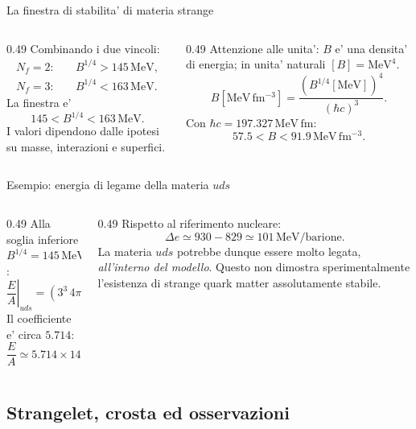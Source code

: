 \begin{frame}{La finestra di stabilita' di materia strange}
\small
\begin{columns}[T,onlytextwidth]
\begin{column}{0.49\textwidth}
Combinando i due vincoli:
\[
\begin{aligned}
N_f=2:&\quad B^{1/4}>145\,\mathrm{MeV},\\
N_f=3:&\quad B^{1/4}<163\,\mathrm{MeV}.
\end{aligned}
\]
La finestra e'
\[
145<B^{1/4}<163\,\mathrm{MeV}.
\]
I valori dipendono dalle ipotesi
su masse, interazioni e superfici.
\end{column}
\begin{column}{0.49\textwidth}
Attenzione alle unita': $B$ e' una
densita' di energia; in unita' naturali
$[B]=\mathrm{MeV}^4$.
\[
B[\mathrm{MeV\,fm^{-3}}]
=\frac{(B^{1/4}[\mathrm{MeV}])^4}
{(\hbar c)^3}.
\]
Con $\hbar c=197.327\,\mathrm{MeV\,fm}$:
\[
57.5<B<91.9\,\mathrm{MeV\,fm^{-3}}.
\]
\end{column}
\end{columns}
\end{frame}

\begin{frame}{Esempio: energia di legame della materia $uds$}
\small
\begin{columns}[T,onlytextwidth]
\begin{column}{0.49\textwidth}
Alla soglia inferiore $B^{1/4}=145\,\mathrm{MeV}$:
\[
\left.\frac EA\right|_{uds}
=(3^3\,4\pi^2)^{1/4}B^{1/4}.
\]
Il coefficiente e' circa $5.714$:
\[
\frac EA\simeq5.714\times145\,\mathrm{MeV}
\simeq829\,\mathrm{MeV}.
\]
\end{column}
\begin{column}{0.49\textwidth}
Rispetto al riferimento nucleare:
\[
\Delta e\simeq930-829
\simeq101\,\mathrm{MeV/barione}.
\]
La materia $uds$ potrebbe dunque essere
molto legata, \emph{all'interno del modello}.
\medskip
Questo non dimostra sperimentalmente
l'esistenza di strange quark matter
assolutamente stabile.
\end{column}
\end{columns}
\end{frame}

\subsection{Strangelet, crosta ed osservazioni}

